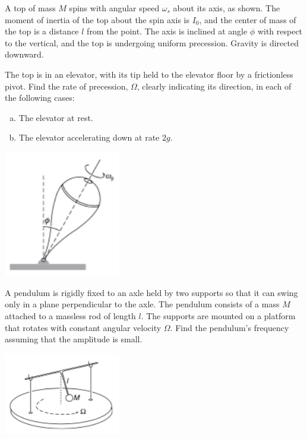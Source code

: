 \documentclass[12pt,letterpaper]{hmcpset}
\begin{document}
\begin{problem}
    A top of mass $M$ spins with angular speed $\omega_{s}$ about its axis, as
    shown. The moment of inertia of the top about the spin axis is $I_{0}$, and
    the center of mass of the top is a distance $l$ from the point. The axis is
    inclined at angle $\phi$ with respect to the vertical, and the top is
    undergoing uniform precession. Gravity is directed downward.

    The top is in an elevator, with its tip held to the elevator floor by a
    frictionless pivot. Find the rate of precession, $\Omega$, clearly indicating
    its direction, in each of the following cases:
    \begin{enumerate}[a)]
        \item The elevator at rest.
        \item The elevator accelerating down at rate $2g$.
    \end{enumerate}

    \begin{center}
        \includegraphics[width=2in]{img/9_6}
    \end{center}
\end{problem}
\begin{solution}
    \vfill
\end{solution}
\clearpage

\begin{problem}
    A pendulum is rigidly fixed to an axle held by two supports so that it can
    swing only in a plane perpendicular to the axle. The pendulum consists of a
    mass $M$ attached to a massless rod of length $l$. The supports are mounted on
    a platform that rotates with constant angular velocity $\Omega$. Find the
    pendulum's frequency assuming that the amplitude is small.

    \begin{center}
        \includegraphics[width=2in]{img/9_12}
    \end{center}
\end{problem}
\begin{solution}
    \vfill
\end{solution}
\clearpage
\end{document}
